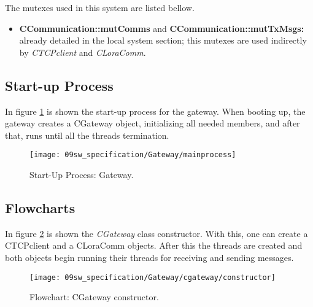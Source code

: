 
The mutexes used in this system are listed bellow.

\begin{itemize}
	\item \textbf{CCommunication::mutComms} and \textbf{CCommunication::mutTxMsgs:} already detailed in the local system section; this mutexes are used indirectly by \textit{CTCPclient} and \textit{CLoraComm}.
\end{itemize}

\subsection{Start-up Process}
In figure \ref{fig:bootGateway} is shown the start-up process for the gateway. When booting up, the gateway creates a CGateway object, initializing all needed members, and after that, runs until all the threads termination.

\begin{figure}[H]
	\centering		\texttt{[image: 09sw\_specification/Gateway/mainprocess]}
	\caption{Start-Up Process: Gateway.}
	\label{fig:bootGateway}
\end{figure}

\clearpage
\subsection{Flowcharts}


In figure \ref{fig:gwtCGatewayconstructor} is shown the \textit{CGateway} class constructor. With this, one can create a CTCPclient and a CLoraComm objects. After this the threads are created and both objects begin running their threads for receiving and sending messages.

\begin{figure}[H]
	\centering
	\texttt{[image: 09sw\_specification/Gateway/cgateway/constructor]}
	\caption{Flowchart: CGateway constructor.}
	\label{fig:gwtCGatewayconstructor}
\end{figure}

